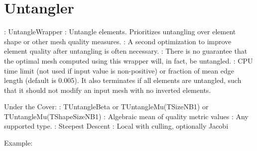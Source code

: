 \newpage

\section{Untangler} \label{sec:Untangler}

: UntangleWrapper \newline
{}: Untangle elements.  Prioritizes untangling over
element shape or other mesh quality measures.  \newline
{}: A second optimization to improve element quality
after untangling is often necessary.  \newline
{}: There is no guarantee that the optimal mesh computed using this wrapper will, in fact, be untangled.  \newline
{}: CPU time limit (not used if input
value is non-positive) or fraction of mean edge length (default is 0.005).  It
also terminates if all elements are untangled, such that it should not modify
an input mesh with no inverted elements. \newline \newline

\noindent Under the Cover: \newline
{}: TUntangleBeta or TUntangleMu(TSizeNB1) or TUntangleMu(TShapeSizeNB1) \newline
{}: Algebraic mean of quality metric values \newline
{}: Any supported type. \newline
{}: Steepest Descent \newline
{}: Local with culling, optionally Jacobi \newline

\noindent Example: \newline

